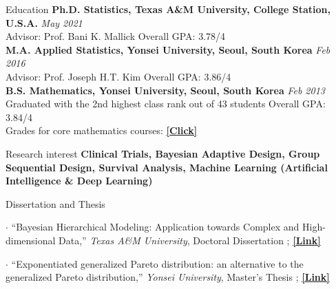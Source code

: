 \documentclass{resume} %
\begin{document}

\begin{rSection}{Education}
{\bf Ph.D. Statistics, Texas A\&M University, College Station, U.S.A.} \hfill {\em May 2021} \\ 
Advisor: Prof. Bani K. Mallick
\hfill {Overall GPA: 3.78/4}\\
{\bf M.A. Applied Statistics, Yonsei University, Seoul, South Korea} \hfill {\em Feb 2016} \\ 
Advisor: Prof. Joseph H.T. Kim
\hfill {Overall GPA: 3.86/4}
\\
{\bf B.S. Mathematics, Yonsei University, Seoul, South Korea} \hfill {\em Feb 2013} \\ 
Graduated with the 2nd highest class rank out of 43 students
\hfill {Overall GPA: 3.84/4}\\
{Grades for core mathematics courses:
\href{https://www.dropbox.com/s/jjjwq3e69xloi96/subjects%28math%29.pdf?dl=0}
{\underline{\textbf{[Click]}}}}
\end{rSection}



\begin{rSection}{Research interest}
\textbf{Clinical Trials, Bayesian Adaptive Design, Group Sequential Design, Survival Analysis, Machine Learning (Artificial Intelligence \& Deep Learning)}
\end{rSection}


\begin{rSection}{Dissertation and Thesis}
\item[$\cdot$] ``Bayesian Hierarchical Modeling: Application towards Complex and High-dimensional Data,''
\textit{Texas A\&M University}, Doctoral Dissertation
 ;
\href{https://oaktrust.library.tamu.edu/handle/1969.1/195691}{\underline{\textbf{[Link]}}}
\item[$\cdot$] ``Exponentiated generalized Pareto distribution: an alternative to the generalized Pareto distribution,''
\textit{Yonsei University}, Master's Thesis
;
\href{https://library.yonsei.ac.kr/search/detail/CAT000001777455?briefLink=/main/searchBrief?q=Seyoon+lee}{\underline{\textbf{[Link]}}}
\end{rSection}
\end{document}

